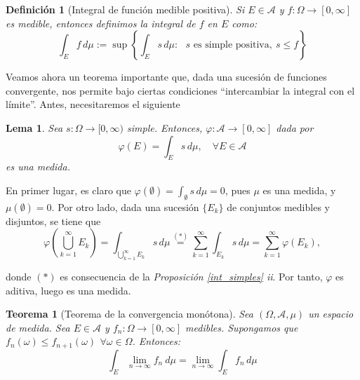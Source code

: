\documentclass[11pt, a4paper]{article}
\makeatletter
\newif\IfInSansMode
\let\oldsf\sffamily
\renewcommand*{\sffamily}{\oldsf\mathversion{sans}\InSansModetrue}
\let\oldnorm\normalfont
\renewcommand*{\normalfont}{\oldnorm\InSansModefalse\mathversion{normal}}
\newcommand{\W}{\Omega}
\renewcommand{\O}{\emptyset}
\renewenvironment{proof}[1][\proofname] {\par\pushQED{\qed}\normalfont\topsep6\p@\@plus6\p@\relax\trivlist\item[\hskip\labelsep\itshape\sffamily#1\@addpunct{.}]\ignorespaces}{\popQED\endtrivlist\@endpefalse}
\theoremstyle{theorem-style}
\newtheorem{nth}{Teorema}[section]
\newtheorem{lema}{Lema}[section]
\theoremstyle{definition-style}
\newtheorem{ndef}{Definición}[section]
\theoremstyle{remark-style}
\theoremstyle{example-style}
\makeatother
\begin{document}
\begin{ndef}[Integral de función medible positiva]
  Si $E\in \mathscr A$ y $f: \Omega \to [0,\infty]$ es medible, entonces definimos la integral de $f$ en $E$ como:
  \[
    \int_E f\, d\mu := \sup\left\{\int_E s\, d\mu: \text{ $s$ es simple positiva}, \ s \leq f\right\}
  \]
  
\end{ndef}

Veamos ahora un teorema importante que, dada una sucesión de funciones convergente, nos permite bajo ciertas condiciones ``intercambiar la integral con el límite''. Antes, necesitaremos el siguiente


\begin{lema} \label{phi}
	Sea $s:\W \to [0,\infty)$ simple. Entonces, $\varphi:\mathscr A \to [0,\infty]$ dada por $$\varphi(E) = \int_E s\, d\mu, \quad \forall E \in \mathscr A$$ es una medida.
\end{lema}

	\begin{proof} En primer lugar, es claro que $\displaystyle \varphi(\emptyset) = \int_\emptyset s\, d\mu = 0$, pues $\mu$ es una medida, y $\mu(\O) = 0$. Por otro lado, dada una sucesión $\{E_k\}$ de conjuntos medibles y disjuntos, se tiene que $$\varphi \left(\bigcup_{k=1}^\infty E_k \right) = \int_{\bigcup_{k=1}^\infty E_k} s\, d\mu \overset{(*)}{=} \sum_{k=1}^\infty \int_{E_k} s\, d\mu = \sum_{k=1}^\infty \varphi(E_k),$$ 
	
	donde $(*)$ es consecuencia de la \textit{Proposición \ref{int_simples} ii}. Por tanto, $\varphi$ es aditiva, luego es una medida.
\end{proof}

\begin{nth}[Teorema de la convergencia monótona] \label{tcm}
  Sea $(\Omega,\mathscr A,\mu)$ un espacio de medida. Sea $E\in \mathscr A$ y $f_n: \Omega \to [0,\infty]$ medibles. Supongamos que $f_n(\omega) \leq f_{n+1}(\omega) \, \ \forall \omega \in \Omega$. Entonces:
  \[
    \int_E \lim_{n \to \infty} f_n\ d\mu = \lim_{n \to \infty}\int_E f_n\, d \mu
  \]
\end{nth}
\end{document}
